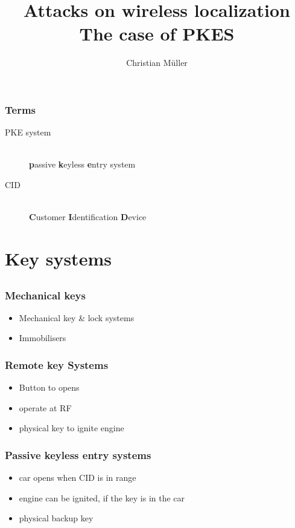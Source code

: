 \documentclass[12pt]{beamer}
\title{Attacks on wireless localization\\ The case of PKES}
\author{Christian Müller}
\begin{document}
	\begin{frame}
		\titlepage
	\end{frame}

	\begin{frame}
		\tableofcontents
	\end{frame}

	\begin{frame}
		\frametitle{Terms}
			\begin{description}
				\item[PKE system]\hfill \\
						\textbf{p}assive \textbf{k}eyless \textbf{e}ntry system
				\item[CID] \hfill \\
					\textbf{C}ustomer \textbf{I}dentification \textbf{D}evice
			\end{description}
	\end{frame}
	
\section{Key systems}
\subsection*{}
	\begin{frame}
		\frametitle{Mechanical keys}
		\begin{itemize}
			\item Mechanical key \& lock systems
			\item Immobilisers
		\end{itemize}
	\end{frame}
	
	\begin{frame}
		\frametitle{Remote key Systems}
		\begin{itemize}
			\item Button to opens
			\item operate at RF 	%
			\item physical key to ignite engine
		\end{itemize}
	\end{frame}

	\begin{frame}
		\frametitle{Passive keyless entry systems}
		\begin{itemize}
			\item car opens when CID is in range
			\item engine can be ignited, if the key is in the car
			\item physical backup key
		\end{itemize}
	\end{frame}
\end{document}
